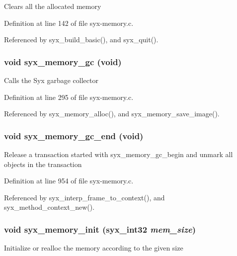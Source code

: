 Clears all the allocated memory 

Definition at line 142 of file syx-memory.c.

Referenced by syx\_\-build\_\-basic(), and syx\_\-quit().\hypertarget{syx-memory_8c_af66c4dd6200e6cc9bb87e7b28921599}{
\subsubsection{\setlength{\rightskip}{0pt plus 5cm}void syx\_\-memory\_\-gc (void)}}
\label{syx-memory_8c_af66c4dd6200e6cc9bb87e7b28921599}


Calls the Syx garbage collector 

Definition at line 295 of file syx-memory.c.

Referenced by syx\_\-memory\_\-alloc(), and syx\_\-memory\_\-save\_\-image().\hypertarget{syx-memory_8c_31d33852bc51d3d58ea0bc9fbfd4d9e1}{
\subsubsection{\setlength{\rightskip}{0pt plus 5cm}void syx\_\-memory\_\-gc\_\-end (void)}}
\label{syx-memory_8c_31d33852bc51d3d58ea0bc9fbfd4d9e1}


Release a transaction started with syx\_\-memory\_\-gc\_\-begin and unmark all objects in the transaction 

Definition at line 954 of file syx-memory.c.

Referenced by syx\_\-interp\_\-frame\_\-to\_\-context(), and syx\_\-method\_\-context\_\-new().\hypertarget{syx-memory_8c_f05eed3c8106e186265edf51194b912c}{
\subsubsection{\setlength{\rightskip}{0pt plus 5cm}void syx\_\-memory\_\-init ({\bf syx\_\-int32} {\em mem\_\-size})}}
\label{syx-memory_8c_f05eed3c8106e186265edf51194b912c}


Initialize or realloc the memory according to the given size 

